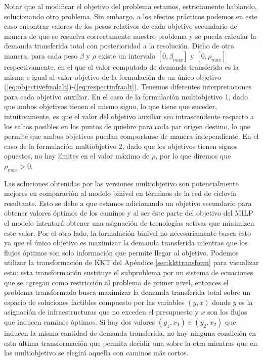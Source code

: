 Notar que al modificar el objetivo del problema estamos, estrictamente hablando, solucionando otro problema. Sin embargo, a los efectos prácticos podemos en este caso encontrar valores de los pesos relativos de cada objetivo secundario de manera de que se resuelva correctamente nuestro problema y se pueda calcular la demanda transferida total con posterioridad a la resolución. Dicho de otra manera, para cada peso $\beta$ y $\rho$ existe un intervalo $[0, \beta_{max}]$ y $[0, \rho_{max}]$ respectivamente, en el que el valor computado de demanda transferida es la misma e igual al valor objetivo de la formulación de un único objetivo (\ref{eq:objectivefinalalt})-(\ref{eq:respectinfraalt}). Tenemos diferentes interpretaciones para cada objetivo auxiliar. En el caso de la formulación multiobjetivo 1, dado que ambos objetivos tienen el mismo signo, lo que tiene que suceder, intuitivamente, es que el valor del objetivo auxiliar sea intrascendente respecto a los saltos posibles en los puntos de quiebre para cada par origen destino, lo que permite que ambos objetivos puedan comportarse de manera independiente. En el caso de la formulación multiobjetivo 2, dado que los objetivos tienen signos opuestos, no hay límites en el valor máximo de $\rho$, por lo que diremos que $\rho_{max} > 0$.

Las soluciones obtenidas por las versiones multiobjetivo son potencialmente mejores en comparación al modelo binivel en términos de la red de ciclovía resultante. Esto se debe a que estamos adicionando un objetivo secundario para obtener valores óptimos de los caminos y al ser éste parte del objetivo del MILP el modelo intentará obtener una asignación de tecnologías activas que minimizen este valor. Por el otro lado, la formulación binivel no necesariamente busca esto ya que el único objetivo es maximizar la demanda transferida mientras que los flujos óptimos son solo información que permite llegar al objetivo. Podemos utilizar la transformación de KKT del Apéndice \ref{sec:kkttransform} para visualizar esto: esta transformación sustituye el subproblema por un sistema de ecuaciones que se agregan como restricción al problema de primer nivel, entonces el problema transformado busca maximizar la demanda transferida total sobre un espacio de soluciones factibles compuesto por las variables $(y, x)$ donde $y$ es la asignación de infraestructuras que no exceden el presupuesto y $x$ son los flujos que inducen caminos óptimos. Si hay dos valores $(y_1, x_1)$ e $(y_2, x_2)$ que inducen la misma cantidad de demanda transferida, no hay ninguna condición en esta última transformación que permita decidir una sobre la otra mientras que en las multiobjetivo se elegirá aquella con caminos más cortos.

